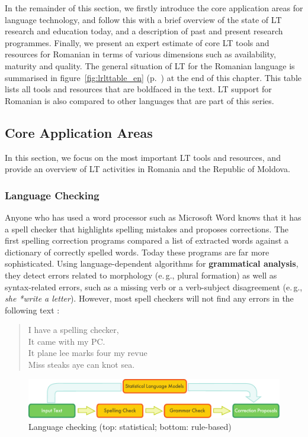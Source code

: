 \begin{multicols}{2}
In the remainder of this section, we firstly introduce the core application areas for language technology, and follow this with a brief overview of the state of LT research and education today, and a description of past and present research programmes. Finally, we present an expert estimate of core LT tools and resources for Romanian in terms of various dimensions such as availability, maturity and quality. The general situation of LT for the Romanian language is summarised in figure~\ref{fig:lrlttable_en} (p.~\pageref{fig:lrlttable_en}) at the end of this chapter. This table lists all tools and resources that are boldfaced in the text. LT support for Romanian is also compared to other languages that are part of this series.

\subsection{Core Application Areas}

In this section, we focus on the most important LT tools and resources, and provide an overview of LT activities in Romania and the Republic of Moldova. 

\subsubsection{Language Checking}

Anyone who has used a word processor such as Microsoft Word knows that it has a spell checker that highlights spelling mistakes and proposes corrections. The first spelling correction programs compared a list of extracted words against a dictionary of correctly spelled words. Today these programs are far more sophisticated. Using language-dependent algorithms for \textbf{grammatical analysis}, they detect errors related to morphology (e.\,g., plural formation) as well as syntax-related errors, such as a missing verb or a verb-subject disagreement (e.\,g., \textit{she *write a letter}). However, most spell checkers will not find any errors in the following text \cite{zar1}:

\begin{quote}
  I have a spelling checker,\\
  It came with my PC.\\
  It plane lee marks four my revue\\
  Miss steaks aye can knot sea.
\end{quote}

\begin{figure}[htb]
\center
\includegraphics[width=\textwidth]{../_media/english/language_checking}
\caption{Language checking (top: statistical; bottom: rule-based)}
\label{fig:langcheckingaarch_en}
\vspace{-15mm}
\end{figure}


\end{multicols}
